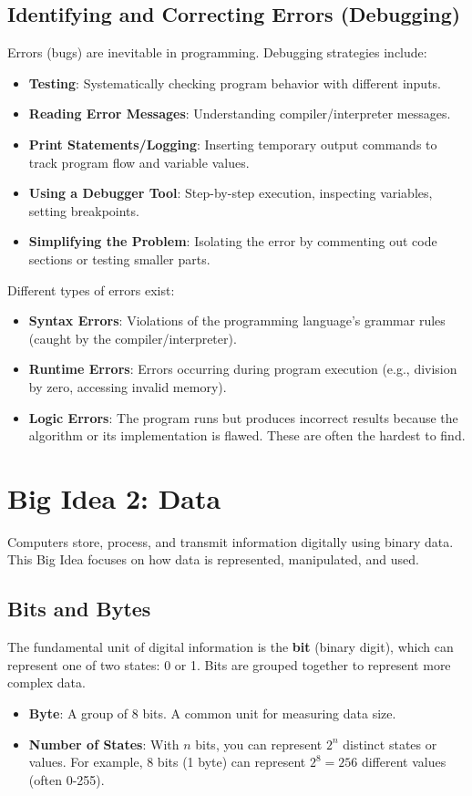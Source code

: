 \documentclass[11pt,oneside]{book}
\begin{document}
\section{Identifying and Correcting Errors (Debugging)}
\label{sec:debugging}
Errors (bugs) are inevitable in programming. Debugging strategies include:
\begin{itemize}
    \item \textbf{Testing}: Systematically checking program behavior with different inputs.
    \item \textbf{Reading Error Messages}: Understanding compiler/interpreter messages.
    \item \textbf{Print Statements/Logging}: Inserting temporary output commands to track program flow and variable values.
    \item \textbf{Using a Debugger Tool}: Step-by-step execution, inspecting variables, setting breakpoints.
    \item \textbf{Simplifying the Problem}: Isolating the error by commenting out code sections or testing smaller parts.
\end{itemize}
Different types of errors exist:
\begin{itemize}
    \item \textbf{Syntax Errors}: Violations of the programming language's grammar rules (caught by the compiler/interpreter).
    \item \textbf{Runtime Errors}: Errors occurring during program execution (e.g., division by zero, accessing invalid memory).
    \item \textbf{Logic Errors}: The program runs but produces incorrect results because the algorithm or its implementation is flawed. These are often the hardest to find.
\end{itemize}

\chapter{Big Idea 2: Data}
\label{chap:data}
Computers store, process, and transmit information digitally using binary data. This Big Idea focuses on how data is represented, manipulated, and used.

\section{Bits and Bytes}
\label{sec:bits_bytes}
The fundamental unit of digital information is the \textbf{bit} (binary digit), which can represent one of two states: 0 or 1. Bits are grouped together to represent more complex data.
\begin{itemize}
    \item \textbf{Byte}: A group of 8 bits. A common unit for measuring data size.
    \item \textbf{Number of States}: With $n$ bits, you can represent $2^n$ distinct states or values. For example, 8 bits (1 byte) can represent $2^8 = 256$ different values (often 0-255).
\end{itemize}
\end{document}

